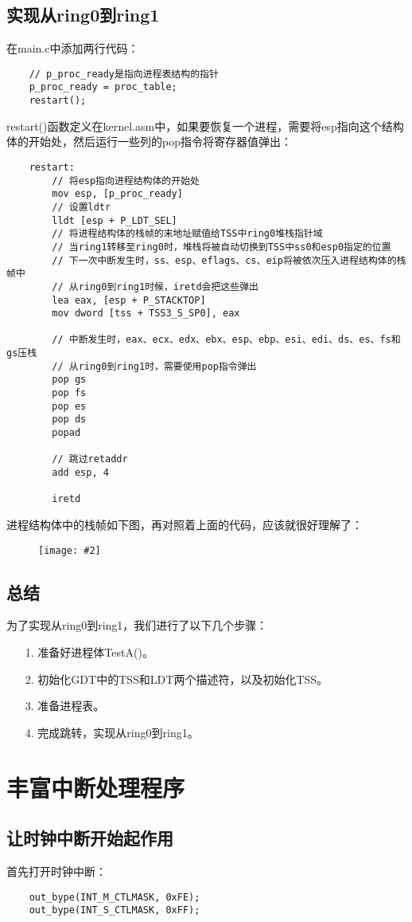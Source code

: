 \documentclass[a4paper,left=2.5cm,right=2.5cm,11pt]{report}
\newcommand{\sizedfic}[2]{\begin{figure}[H]
		\center
		\texttt{[image: \#2]}
	\end{figure}}
\begin{document}
\subsection{实现从ring0到ring1}
	在main.c中添加两行代码：
	\begin{lstlisting}
	// p_proc_ready是指向进程表结构的指针
	p_proc_ready = proc_table;
	restart();
	\end{lstlisting}

	restart()函数定义在kernel.asm中，如果要恢复一个进程，需要将esp指向这个结构体的开始处，然后运行一些列的pop指令将寄存器值弹出：
	\begin{lstlisting}
	restart:
		// 将esp指向进程结构体的开始处
		mov esp, [p_proc_ready]
		// 设置ldtr
		lldt [esp + P_LDT_SEL]
		// 将进程结构体的栈帧的末地址赋值给TSS中ring0堆栈指针域
		// 当ring1转移至ring0时，堆栈将被自动切换到TSS中ss0和esp0指定的位置
		// 下一次中断发生时，ss、esp、eflags、cs、eip将被依次压入进程结构体的栈帧中
		// 从ring0到ring1时候，iretd会把这些弹出
		lea eax, [esp + P_STACKTOP] 
		mov dword [tss + TSS3_S_SP0], eax

		// 中断发生时，eax、ecx、edx、ebx、esp、ebp、esi、edi、ds、es、fs和gs压栈
		// 从ring0到ring1时，需要使用pop指令弹出
		pop gs
		pop fs
		pop es
		pop ds
		popad

		// 跳过retaddr
		add esp, 4

		iretd
	\end{lstlisting}

	进程结构体中的栈帧如下图，再对照着上面的代码，应该就很好理解了：
	\sizedfic{0.3}{3.png}

\subsection{总结}
	为了实现从ring0到ring1，我们进行了以下几个步骤：
	\begin{itemize}
		\item[1.] 准备好进程体TestA()。
		\item[2.] 初始化GDT中的TSS和LDT两个描述符，以及初始化TSS。
		\item[3.] 准备进程表。
		\item[4.] 完成跳转，实现从ring0到ring1。
	\end{itemize}

\section{丰富中断处理程序}
\subsection{让时钟中断开始起作用}
	首先打开时钟中断：
	\begin{lstlisting}
	out_bype(INT_M_CTLMASK, 0xFE);
	out_bype(INT_S_CTLMASK, 0xFF);
	\end{lstlisting}
\end{document}
